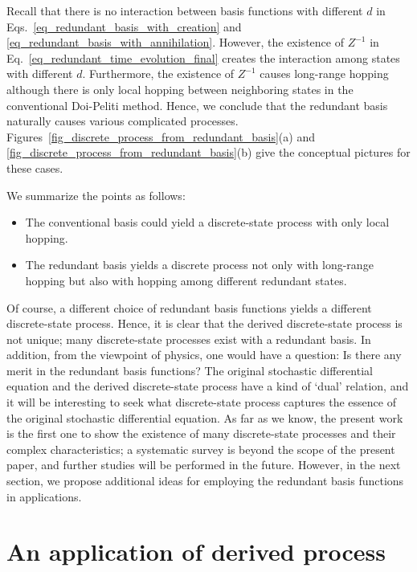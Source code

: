 \documentclass[sn-mathphys,Numbered]{sn-jnl}%
\theoremstyle{thmstyleone}%
\theoremstyle{thmstyletwo}%
\theoremstyle{thmstylethree}%
\begin{document}
Recall that there is no interaction between basis functions with different $d$ in Eqs.~\eqref{eq_redundant_basis_with_creation} and \eqref{eq_redundant_basis_with_annihilation}. However, the existence of $Z^{-1}$ in Eq.~\eqref{eq_redundant_time_evolution_final} creates the interaction among states with different $d$. Furthermore, the existence of $Z^{-1}$ causes long-range hopping although there is only local hopping between neighboring states in the conventional Doi-Peliti method. Hence, we conclude that the redundant basis naturally causes various complicated processes. Figures~\ref{fig_discrete_process_from_redundant_basis}(a) and \ref{fig_discrete_process_from_redundant_basis}(b) give the conceptual pictures for these cases.


We summarize the points as follows:
\begin{itemize}
\item The conventional basis could yield a discrete-state process with only local hopping.
\item The redundant basis yields a discrete process not only with long-range hopping but also with hopping among different redundant states.
\end{itemize}


Of course, a different choice of redundant basis functions yields a different discrete-state process. Hence, it is clear that the derived discrete-state process is not unique; many discrete-state processes exist with a redundant basis. In addition, from the viewpoint of physics, one would have a question: Is there any merit in the redundant basis functions? The original stochastic differential equation and the derived discrete-state process have a kind of `dual' relation, and it will be interesting to seek what discrete-state process captures the essence of the original stochastic differential equation. As far as we know, the present work is the first one to show the existence of many discrete-state processes and their complex characteristics; a systematic survey is beyond the scope of the present paper, and further studies will be performed in the future. However, in the next section, we propose additional ideas for employing the redundant basis functions in applications.



\section{An application of derived process}
\label{sec_application}
\end{document}
